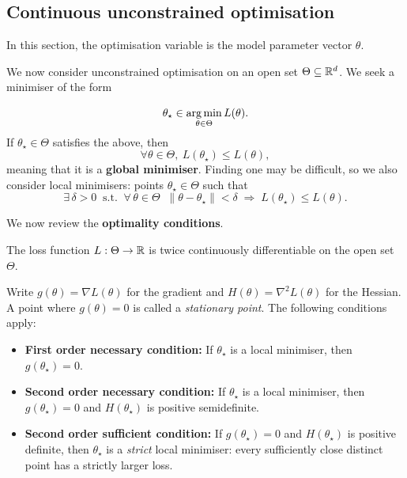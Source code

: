 
\subsection{Continuous unconstrained optimisation} %
\label{sec:continuous_optimisation}

\begin{remark}
In this section, the optimisation variable is the model parameter vector $\theta$.
\end{remark}

We now consider unconstrained optimisation on an open set $\Theta\subseteq\mathbb{R}^d$. We seek a minimiser of the form

\begin{equation}
	\theta_\star \in \operatorname*{arg\,min}_{\theta\in\Theta} L(\theta).
\end{equation}
If $\theta_\star\in\Theta$ satisfies the above, then
\begin{equation}
	\forall \theta\in\Theta,~ L(\theta_\star) \leq L(\theta),
\end{equation}
meaning that it is a \textbf{global minimiser}. Finding one may be difficult, so we also consider local minimisers: points $\theta_\star\in\Theta$ such that 
\begin{equation}
\exists\, \delta > 0  \;\; 
\text{s.t.} \;\; \forall\, \theta \in \Theta \;\; 
\|\theta - \theta_\star\| < \delta 
\;\Rightarrow\;
L(\theta_\star) \le L(\theta).
\end{equation}

We now review the \textbf{optimality conditions}.

\begin{assumption}
The loss function $L:\Theta\to\mathbb{R}$ is twice continuously differentiable on the open set $\Theta$.
\end{assumption}

Write $g(\theta)=\nabla L(\theta)$ for the gradient and $H(\theta)=\nabla^2 L(\theta)$ for the Hessian. A point where $g(\theta)=0$ is called a \emph{stationary point}. The following conditions apply:

\begin{itemize}
    \item \textbf{First order necessary condition:} If $\theta_\star$ is a local minimiser, then $g(\theta_\star)=0$.
    \item \textbf{Second order necessary condition:} If $\theta_\star$ is a local minimiser, then $g(\theta_\star)=0$ and $H(\theta_\star)$ is positive semidefinite.
    \item \textbf{Second order sufficient condition:} If $g(\theta_\star)=0$ and $H(\theta_\star)$ is positive definite, then $\theta_\star$ is a \emph{strict} local minimiser: every sufficiently close distinct point has a strictly larger loss.
\end{itemize}

